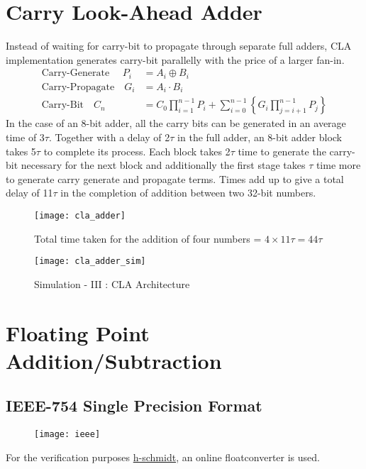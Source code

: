 \documentclass[11pt]{article}
\begin{document}
    \section{Carry Look-Ahead Adder}
    Instead of waiting for carry-bit to propagate through separate full adders, CLA implementation
    generates carry-bit parallelly with the price of a larger fan-in.
\vspace{-.25cm}
    \begin{align*}
        \text{Carry-Generate }\quad P_i &= A_i \oplus B_i\\
        \text{Carry-Propagate}\quad G_i &= A_i \cdot B_i\\
        \text{Carry-Bit} \quad  C_n &= C_0 \prod_{i=1}^{n-1}P_i+\sum_{i=0}^{n-1}\left\{ G_i \prod_{j=i+1}^{n-1}P_j \right\}
    \end{align*}
    In the case of an 8-bit adder, all the carry bits can be generated in an average time of 3$\tau$.
    Together with a delay of 2$\tau$ in the full adder, an 8-bit adder block takes 5$\tau$ to complete
    its process.
    Each block takes 2$\tau$ time to generate the carry-bit necessary for the next block and additionally
    the first stage takes $\tau$ time more to generate carry generate and propagate terms. Times add up
    to give a total delay of 11$\tau$ in the completion of addition between two 32-bit numbers.
    \begin{figure}[h]
        \begin{center}
            \texttt{[image: cla\_adder]}
            \caption*{Total time taken for the addition of four numbers = $4\times 11\tau = 44\tau$}
            \texttt{[image: cla\_adder\_sim]}
            \caption*{Simulation - III : CLA Architecture}
        \end{center}
    \end{figure}


    \section{Floating Point Addition/Subtraction}

    \subsection{IEEE-754 Single Precision Format}
    \begin{figure}[h]
        \begin{center}
            \texttt{[image: ieee]}
        \end{center}
    \end{figure}
    For the verification purposes \href{https://www.h-schmidt.net/FloatConverter/IEEE754.html}{h-schmidt}, an online floatconverter is used.
\end{document}
